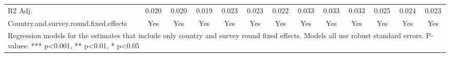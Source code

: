 \begin{table}
\begin{tabular}[t]{lcccccccccccc}
R2 Adj. & \num{0.020} & \num{0.020} & \num{0.019} & \num{0.023} & \num{0.023} & \num{0.022} & \num{0.033} & \num{0.033} & \num{0.033} & \num{0.025} & \num{0.024} & \num{0.023}\\
Country.and.survey.round.fixed.effects & Yes & Yes & Yes & Yes & Yes & Yes & Yes & Yes & Yes & Yes & Yes & Yes\\
\bottomrule
\multicolumn{13}{l}{\rule{0pt}{1em}Regression models for the estimates that include only country and survey round fixed effects. Models all use robust standard errors. P-values: *** p<0.001, ** p<0.01, * p<0.05}\\
\end{tabular}
\end{table}

